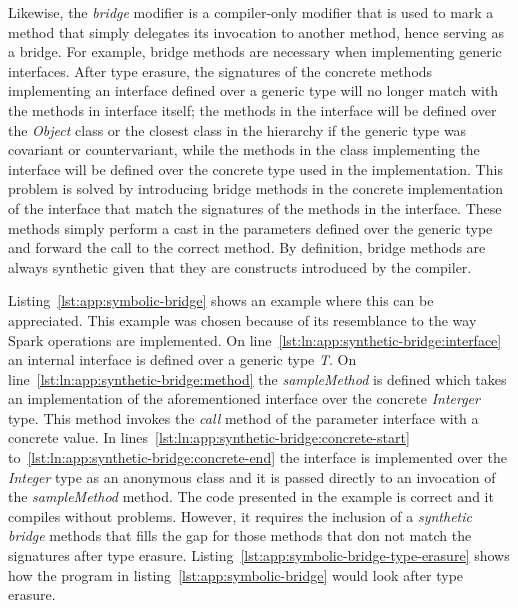 Likewise, the \textit{bridge} modifier is a compiler-only modifier that is used to mark a method that simply delegates its invocation to another method, hence serving as a bridge. For example, bridge methods are necessary when implementing generic interfaces. After type erasure, the signatures of the concrete methods implementing an interface defined over a generic type will no longer match with the methods in interface itself; the methods in the interface will be defined over the \textit{Object} class or the closest class in the hierarchy if the generic type was covariant or countervariant, while the methods in the class implementing the interface will be defined over the concrete type used in the implementation. This problem is solved by introducing bridge methods in the concrete implementation of the interface that match the signatures of the methods in the interface. These methods simply perform a cast in the parameters defined over the generic type and forward the call to the correct method. By definition, bridge methods are always synthetic given that they are constructs introduced by the compiler.

Listing~\ref{lst:app:symbolic-bridge} shows an example where this can be appreciated. This example was chosen because of its resemblance to the way Spark operations are implemented. On line~\ref{lst:ln:app:synthetic-bridge:interface} an internal interface is defined over a generic type \textit{T}. On line~\ref{lst:ln:app:synthetic-bridge:method} the \textit{sampleMethod} is defined which takes an implementation of the aforementioned interface over the concrete \textit{Interger} type. This method invokes the \textit{call} method of the parameter interface with a concrete value. In lines~\ref{lst:ln:app:synthetic-bridge:concrete-start} to~\ref{lst:ln:app:synthetic-bridge:concrete-end} the interface is implemented over the \textit{Integer} type as an anonymous class and it is passed directly to an invocation of the \textit{sampleMethod} method. The code presented in the example is correct and it compiles without problems. However, it requires the inclusion of a \textit{synthetic bridge} methods that fills the gap for those methods that don not match the signatures after type erasure. Listing~\ref{lst:app:symbolic-bridge-type-erasure} shows how the program in listing~\ref{lst:app:symbolic-bridge} would look after type erasure. 

